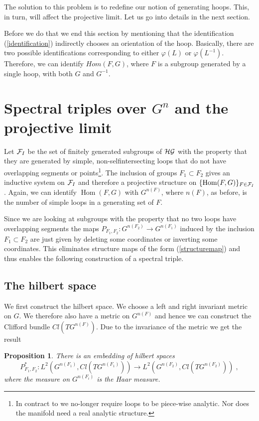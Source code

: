 \documentclass[12pt]{article}
\def\cf{{\cal F}}
\def\cg{{\cal G}}
\def\ch{{\cal H}}
\newtheorem{proposition}[thm]{Proposition}
\newcommand{\Hom}{\operatorname{Hom}}
\begin{document}
The solution to this problem is to redefine our notion of generating
hoops. This, in turn, will affect the projective limit. Let us go
into details in the next section.

Before we do that we end this section by mentioning that the
identification (\ref{identification}) indirectly chooses an orientation of the
hoop. Basically, there are two possible identifications corresponding to
either $\varphi(L)$ or $\varphi(L^{-1})$. Therefore, we can identify
$Hom(F,G)$, where $F$ is a subgroup generated by a single hoop, with both $G$
and $G^{-1}$.




\section{Spectral triples over $G^n$ and the projective limit}
\label{hilbert-section}

Let $\cf_I$ be the set of finitely generated subgroups of $\ch\cg$ with the
property that they are generated by simple, non-selfintersecting loops that do
not have overlapping segments or points\footnote{In contract to
  \cite{Ashtekar:1993wf} we no-longer require loops to be piece-wise
  analytic. Nor does the manifold need a real analytic structure.}. The inclusion of groups $F_1\subset F_2$ gives
an inductive system on $\cf_I$ and therefore a projective structure on $\{
\Hom ( F,G)\}_{F\in \cf_I}$. Again, we can identify $\Hom (F,G)$ with
$G^{n(F)}$, where $n(F)$, as before, is the number of simple loops in a generating set of $F$. 

Since we are looking at subgroups with the property that no two loops have
overlapping segments the maps $P_{F_1,F_2}:G^{n(F_2)} \to G^{n(F_1)}$
induced by the inclusion $F_1 \subset F_2$ are just given by deleting some
coordinates or inverting some coordinates. This eliminates structure maps of
the form (\ref{structuremap}) and thus enables the following construction of a 
spectral triple.

\subsection{The hilbert space}

We first construct the hilbert space. We choose a left and right invariant
metric on $G$. We therefore also have a metric on $G^{n(F)}$ and hence we can
construct the Clifford bundle $Cl(TG^{n(F)})$. Due to the invariance of the
metric we get the result
\begin{proposition}
\label{prop}
There is  an embedding of hilbert spaces 
$$P_{F_1,F_2}^* :L^2(G^{n(F_1)},Cl(TG^{n(F_1)})) \to L^2(G^{n(F_2)},Cl(TG^{n(F_2)}))\;,$$
where the measure on $G^{n(F_i)}$ is the Haar measure. 
\end{proposition}
\end{document}
